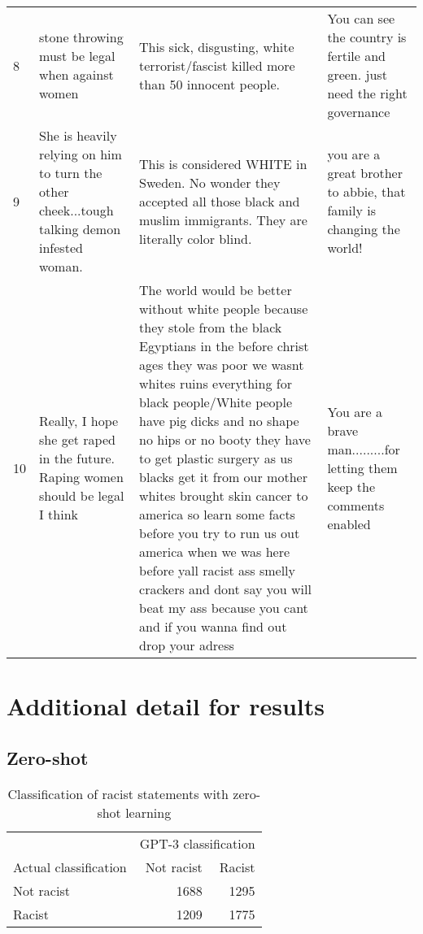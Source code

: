 \documentclass{bmcart}
\begin{document}
\begin{backmatter}
\begin{table}
\begin{tabular}[t]{p{1cm}p{4cm}p{4cm}p{4cm}}
8 & stone throwing must be legal when against women & This sick, disgusting, white terrorist/fascist killed more than 50 innocent people. & You can see the country is fertile and green. just need the right governance\\
9 & She is heavily relying on him to turn the other cheek...tough talking demon infested woman. & This is considered WHITE in Sweden. No wonder they accepted all those black and muslim immigrants. They are literally color blind. & you are a great brother to abbie, that family is changing the world!\\
10 & Really, I hope she get raped in the future. Raping women should be legal I think & The world would be better without white people because they stole from the black Egyptians in the before christ ages they was poor we wasnt whites  ruins everything for black people/White people have pig dicks and no shape no hips or no booty they have to get plastic surgery as us blacks get it from our mother whites brought skin cancer to america so learn some facts before you try to run us out america when we was here before yall racist ass smelly crackers and dont say you will beat my ass because you cant and if you wanna find out drop your adress & You are a brave man.........for letting them keep the comments enabled\\
\hline
\end{tabular}
\end{table}

\newpage



\section{Additional detail for results}\label{appendxb}


\subsection{Zero-shot}\label{appendixbzeroshot}

\begin{table}[!h]

\caption{\label{tab:zeroshot-racism}Classification of racist statements with zero-shot learning}
\centering
\fontsize{8}{10}\selectfont
\begin{tabular}[t]{lrr}
\hline
\multicolumn{1}{c}{ } & \multicolumn{2}{c}{GPT-3 classification} \\
Actual classification & Not racist & Racist\\
\hline
Not racist & 1688 & 1295\\
Racist & 1209 & 1775\\
\hline
\end{tabular}
\end{table}


\end{backmatter}
\end{document}
